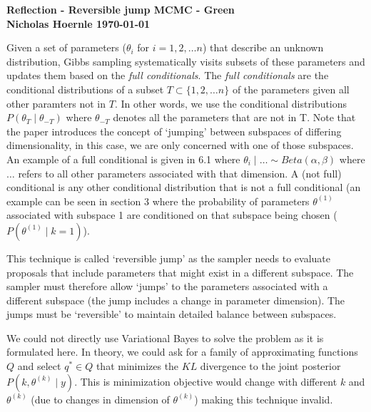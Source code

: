 \documentclass[twoside]{article}
\begin{document}
\textbf{Reflection - Reversible jump MCMC - Green}\\
\textbf{Nicholas Hoernle \hfill \today}

Given a set of parameters (${\theta_i}$ for $i = 1, 2, \hdots n$) that describe an unknown distribution, Gibbs sampling systematically visits subsets of these parameters and updates them based on the \textit{full conditionals}. The \textit{full conditionals} are the conditional distributions of a subset $T \subset \{ 1, 2, \hdots n \}$ of the parameters given all other paramters not in $T$. In other words, we use the conditional distributions $P(\theta_T \mid \theta_{-T})$ where $\theta_{-T}$ denotes all the parameters that are not in T. Note that the paper introduces the concept of `jumping' between subspaces of differing dimensionality, in this case, we are only concerned with one of those subspaces. An example of a full conditional is given in 6.1 where $\theta_i \mid \hdots \sim Beta(\alpha,\beta)$ where $\hdots$ refers to all other parameters associated with that dimension. A (not full) conditional is any other conditional distribution that is not a full conditional (an example can be seen in section 3 where the probability of parameters $\theta^{(1)}$ associated with subspace 1 are conditioned on that subspace being chosen ($P(\theta^{(1)} \mid k = 1)$).

This technique is called `reversible jump' as the sampler needs to evaluate proposals that include parameters that might exist in a different subspace. The sampler must therefore allow `jumps' to the parameters associated with a different subspace (the jump includes a change in parameter dimension). The jumps must be `reversible' to maintain detailed balance between subspaces.

We could not directly use Variational Bayes to solve the problem as it is formulated here. In theory, we could ask for a family of approximating functions $Q$ and select $q^* \in Q$ that minimizes the $KL$ divergence to the joint posterior $P(k, \theta^{(k)} \mid y)$. This is minimization objective would change with different $k$ and $\theta^{(k)}$ (due to changes in dimension of $\theta^{(k)}$) making this technique invalid.
\end{document}
